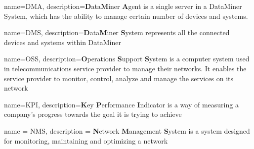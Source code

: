 {
    name=DMA,
    description={\textbf{D}ata\textbf{M}iner \textbf{A}gent is a single server in a DataMiner System, which has the ability to manage certain number of devices and systems.}
}

{
    name=DMS,
    description={\textbf{D}ata\textbf{M}iner \textbf{S}ystem represents all the connected devices and systems within DataMiner}
}

{
    name=OSS,
    description={\textbf{O}perations \textbf{S}upport \textbf{S}ystem is a computer system used in telecommunications service provider to manage their networks. It enables the service provider to monitor, control, analyze
    and manage the services on its network}
}

{
    name=KPI,
    description={\textbf{K}ey \textbf{P}erformance \textbf{I}ndicator is a way of measuring a company's progress towards the goal it is trying to achieve}
}

{
    name        = NMS,
    description = {\textbf{N}etwork \textbf{M}anagement \textbf{S}ystem is a system designed for monitoring, maintaining and optimizing a network}
}



